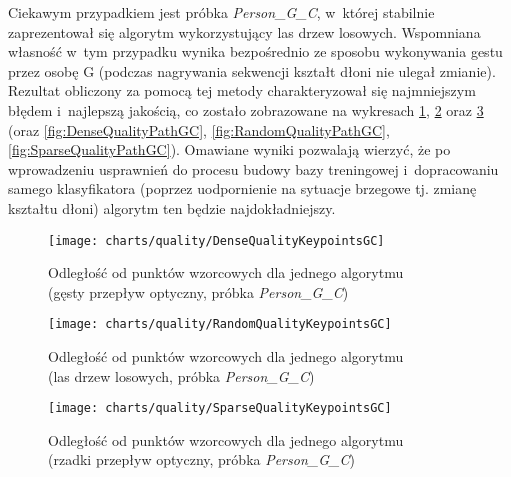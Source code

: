     Ciekawym przypadkiem jest próbka \textit{Person\_G\_C}, w~której stabilnie zaprezentował się algorytm wykorzystujący las drzew losowych. Wspomniana własność w~tym przypadku wynika bezpośrednio ze sposobu wykonywania gestu przez osobę G (podczas nagrywania sekwencji kształt dłoni nie ulegał zmianie). Rezultat obliczony za pomocą tej metody charakteryzował się najmniejszym błędem i~najlepszą jakością, co zostało zobrazowane na wykresach \ref{fig:DenseQualityKeypointsGC}, \ref{fig:RandomQualityKeypointsGC} oraz \ref{fig:SparseQualityKeypointsGC} (oraz \ref{fig:DenseQualityPathGC}, \ref{fig:RandomQualityPathGC}, \ref{fig:SparseQualityPathGC}). Omawiane wyniki pozwalają wierzyć, że po wprowadzeniu usprawnień do procesu budowy bazy treningowej i~dopracowaniu samego klasyfikatora (poprzez uodpornienie na sytuacje brzegowe tj. zmianę kształtu dłoni) algorytm ten będzie najdokładniejszy.

    \newpage
      \begin{figure}[!ht]
        \centering
        \texttt{[image: charts/quality/DenseQualityKeypointsGC]}
        \caption[Odległość od punktów wzorcowych dla jednego algorytmu (gęsty przepływ optyczny, osoba G, gest C)]
                {Odległość od punktów wzorcowych dla jednego algorytmu\\(gęsty przepływ optyczny, próbka \textit{Person\_G\_C})}
        \label{fig:DenseQualityKeypointsGC}
      \end{figure}

      \begin{figure}[!ht]
        \centering
        \texttt{[image: charts/quality/RandomQualityKeypointsGC]}
        \caption[Odległość od punktów wzorcowych dla jednego algorytmu (las drzew losowych, osoba G, gest C)]
                {Odległość od punktów wzorcowych dla jednego algorytmu\\
                 (las drzew losowych, próbka \textit{Person\_G\_C})}
        \label{fig:RandomQualityKeypointsGC}
      \end{figure}

    \newpage
      \begin{figure}[!ht]
        \centering
        \texttt{[image: charts/quality/SparseQualityKeypointsGC]}
        \caption[Odległość od punktów wzorcowych dla jednego algorytmu (rzadki przepływ optyczny, osoba G, gest C)]
                {Odległość od punktów wzorcowych dla jednego algorytmu\\(rzadki przepływ optyczny, próbka \textit{Person\_G\_C})}
        \label{fig:SparseQualityKeypointsGC}
      \end{figure}

